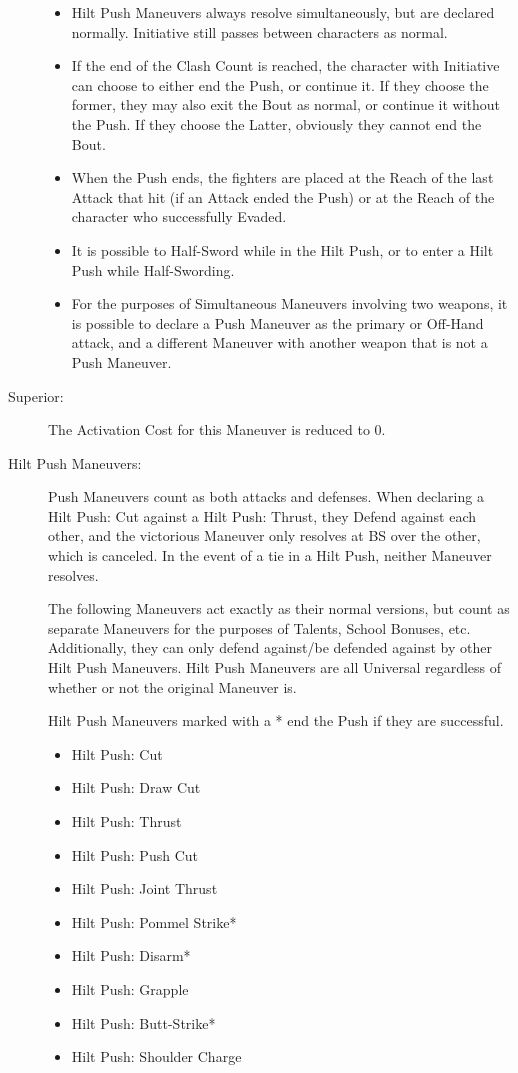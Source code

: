 \documentclass[oneside,11pt,english]{book}
\begin{document}
\begin{description}
\begin{itemize}
		\item Hilt Push Maneuvers always resolve simultaneously, but are declared normally. Initiative still passes 
between characters as normal. 
		\item If the end of the Clash Count is reached, the character with Initiative can choose to either end the Push, or continue it. If they choose the former, they may also exit the Bout as normal, or continue it without the Push. If they choose the Latter, obviously they cannot end the Bout.
		\item When the Push ends, the fighters are placed at the Reach of the last Attack that hit (if an Attack ended the Push) or at the Reach of the character who successfully Evaded.
		\item It is possible to Half-Sword while in the Hilt Push, or to enter a Hilt Push while Half-Swording. 
		\item For the purposes of Simultaneous Maneuvers involving two weapons, it is possible to declare a Push Maneuver as the primary or Off-Hand attack, and a different Maneuver with another weapon that is not a Push Maneuver.
	\end{itemize}
\item [Superior:] The Activation Cost for this Maneuver is reduced to 0. 
\item [Hilt Push Maneuvers:] Push Maneuvers count as both attacks and defenses. When declaring a Hilt Push: 
Cut against a Hilt Push: Thrust, they Defend against each other, and the victorious Maneuver only 
resolves at BS over the other, which is canceled. 
In the event of a tie in a Hilt Push, neither Maneuver resolves. 

The following Maneuvers act exactly as their normal versions, but count as separate Maneuvers for the purposes of Talents, School Bonuses, etc. Additionally, they can only defend against/be defended against by other Hilt Push Maneuvers. Hilt Push Maneuvers are all Universal regardless of whether or not the original Maneuver is.

Hilt Push Maneuvers marked with a * end the Push if they are successful. 
	\begin{itemize}
		[noitemsep]
		\item Hilt Push: Cut 
		\item Hilt Push: Draw Cut 
		\item Hilt Push: Thrust 
		\item Hilt Push: Push Cut 
		\item Hilt Push: Joint Thrust 
		\item Hilt Push: Pommel Strike* 
		\item Hilt Push: Disarm* 
		\item Hilt Push: Grapple 
		\item Hilt Push: Butt-Strike* 
		\item Hilt Push: Shoulder Charge 
	\end{itemize}
\end{description}
\end{document}

